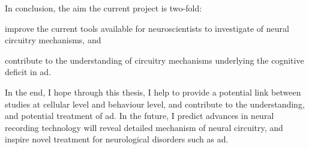 In conclusion, the aim the current project is two-fold: 
\begin{enumerate*}[label={\alph*)}, font={\bfseries}]
    \item improve the current tools available for neuroscientists to investigate of neural circuitry mechanisms, and
    \item contribute to the understanding of circuitry mechanisms underlying the cognitive deficit in \gls{ad}.
\end{enumerate*}
In the end, I hope through this thesis, I help to provide a potential link between studies at cellular level and behaviour level, and contribute to the understanding, and potential treatment of \gls{ad}. In the future, I predict advances in neural recording technology will reveal detailed mechanism of neural circuitry, and inspire novel treatment for neurological disorders such as \gls{ad}. 







